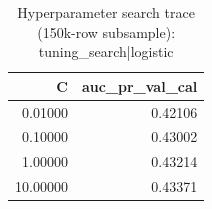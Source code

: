 \begin{table}
\caption{Hyperparameter search trace (150k-row subsample): tuning_search|logistic}
\label{tab:table14_hp_search_logistic}
\begin{tabular}{rr}
\toprule
C & auc\_pr\_val\_cal \\
\midrule
0.01000 & 0.42106 \\
0.10000 & 0.43002 \\
1.00000 & 0.43214 \\
10.00000 & 0.43371 \\
\bottomrule
\end{tabular}
\end{table}
